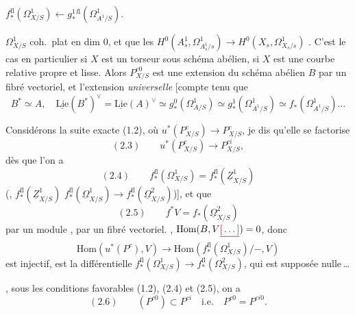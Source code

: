 \documentclass[11pt,a4paper]{article}
\begin{document}
$f^{\mathrm{fl}}_{*}(\Omega^{1}_{X/S}) \leftarrow g^{1\,\mathrm{fl}}_{*}(\Omega^{1}_{A^{1}/S})$.

 $\Omega^{1}_{X/S}$   coh.\ plat en dim 0, et que les \ill{} $H^{0}(A^{1}_{s}, \Omega^{1}_{A^{1}_{s}/s}) \to H^{0}(X_{s}, \Omega^{1}_{X_{s}/s})$  . C'est le cas en particulier si $X$ est un torseur sous schéma abélien, \ill{} si $X$ est une courbe relative  propre et lisse. Alors $P^{c0}_{X/S}$  est une extension du schéma abélien $B$ par un fibré vectoriel, et \ill{}  l'extension \emph{universelle} [compte tenu que
\[
B^{*} \simeq A, \quad \underline{\mathrm{Lie}}(B^{*})^{\vee} = \underline{\mathrm{Lie}}(A)^{\vee} \simeq g^{0}_{*}(\Omega^{1}_{A/S}) \simeq g^{1}_{*}(\Omega^{1}_{A^{1}/S}) \simeq f_{*}(\Omega^{1}_{A^{1}/S}) \ldots
\]

Considérons la suite exacte (1.2), où $u^{*}(P^{c}_{X/S}) \to P^{c}_{X/S}$, je dis qu'elle se factorise
\[
(2.3) \qquad u^{*}(P^{c}_{X/S}) \to P^{ci}_{X/S},
\]
 dès que l'on a
\[
(2.4) \qquad f^{\mathrm{fl}}_{*}(\Omega^{1}_{X/S}) = f^{\mathrm{fl}}_{*}(\underline{Z}^{1}_{X/S})
\]
(,    $f^{\mathrm{fl}}_{*}(\underline{Z}^{1}_{X/S})$   \ill{}  $f^{\mathrm{fl}}_{*}(\underline{\Omega}^{1}_{X/S}) \to f^{\mathrm{fl}}_{*}(\underline{\Omega}^{2}_{X/S})$)], et que   \ill{}
\[
(2.5) \qquad f^{*}V = f_{*}(\underline{\Omega}^{2}_{X/S})
\]
  par un module ,  par un fibré vectoriel.
, \ill{} \ill{} $\mathrm{Hom}(B, V \struck{\ill{}}) = 0$, donc
\[
\mathrm{Hom}(u^{*}(P^{c}), V) \to \mathrm{Hom}(f^{\mathrm{fl}}_{*}(\Omega^{1}_{X/S})/-, V)
\]
est injectif,  \ill{} \ill{} est \ill{} la différentielle $f^{\mathrm{fl}}_{*}(\Omega^{1}_{X/S}) \to f^{\mathrm{fl}}_{*}(\Omega^{2}_{X/S})$, qui est supposée nulle\,…

, sous les conditions favorables (1.2), (2.4) et (2.5), on a
\[
(2.6) \qquad (P^{c0}) \subset P^{ci} \quad \text{i.e.} \quad P^{c0} = P^{ci0}.
\]
\end{document}

